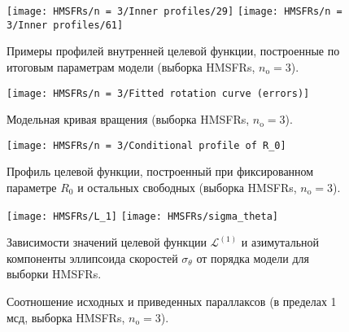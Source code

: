 \documentclass{beamer}
\begin{document}
\begin{frame}
\vspace{2em}
\begin{figure}
  \centering
  \texttt{[image: HMSFRs/n = 3/Inner profiles/29]}
  \texttt{[image: HMSFRs/n = 3/Inner profiles/61]}
  \caption{Примеры профилей внутренней целевой функции, построенные по итоговым параметрам модели (выборка HMSFRs, $ n_\mathrm{o} = 3 $).}
\end{figure}
\end{frame}

\begin{frame}
\vspace{-0.6em}

\end{frame}

\begin{frame}
\vspace{0.5em}
\begin{figure}
  \centering
  \texttt{[image: HMSFRs/n = 3/Fitted rotation curve (errors)]}
  \caption{Модельная кривая вращения (выборка HMSFRs, $ n_\mathrm{o} = 3 $).}
\end{figure}
\end{frame}

\begin{frame}
\vspace{1em}
\begin{figure}
  \centering
  \texttt{[image: HMSFRs/n = 3/Conditional profile of R\_0]}
  \caption{Профиль целевой функции, построенный при фиксированном параметре $ R_0 $ и остальных свободных (выборка HMSFRs, $ n_\mathrm{o} = 3 $).}
\end{figure}
\end{frame}

\begin{frame}
\vspace{2em}
\begin{figure}
  \centering
  \texttt{[image: HMSFRs/L\_1]}
  \texttt{[image: HMSFRs/sigma\_theta]}
  \caption{Зависимости значений целевой функции $ \mathcal{L}^{(1)} $ и азимутальной компоненты эллипсоида скоростей $ \sigma_\theta $ от порядка модели для выборки HMSFRs.}
\end{figure}
\end{frame}

\begin{frame}
\begin{figure}
  \centering
  \subfloat{{\texttt{[image: HMSFRs/n = 3/Parallaxes (under 1 mas)]}}}
  \caption{Соотношение исходных и приведенных параллаксов (в пределах 1 мсд, выборка HMSFRs, $ n_\mathrm{o} = 3$).}
\end{figure}
\end{frame}
\end{document}
